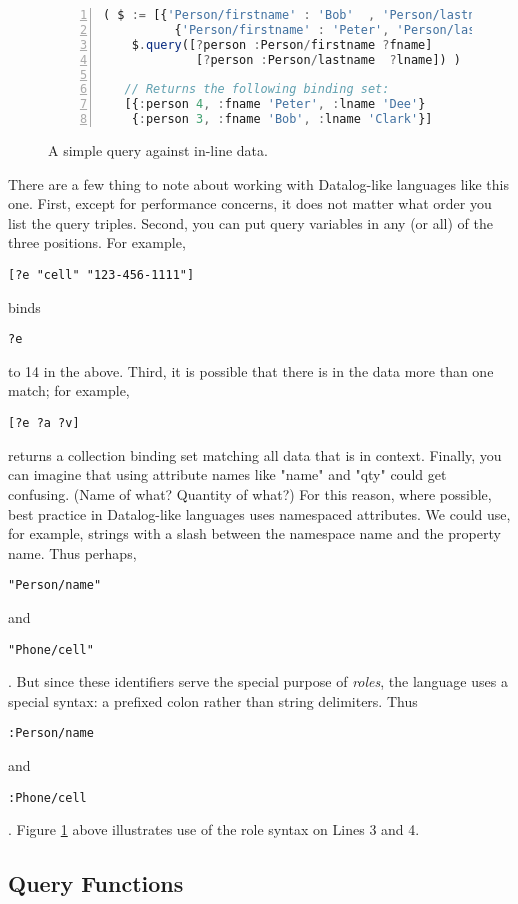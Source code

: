 \documentclass[9pt,letterpaper]{article}
\newcommand{\stt}[1]{\begin{footnotesize}\texttt{#1}\end{footnotesize}}
\begin{document}
\begin{figure}[H]
  \caption{A simple query against in-line data.}
  \label{code:simple-binding-set}
\begin{lstlisting}[language=JavaScript,numberstyle=\scriptsize,basicstyle=\ttfamily\scriptsize,numbers=left,stepnumber=1,breaklines=true]
  ( $ := [{'Person/firstname' : 'Bob'  , 'Person/lastname' : 'Clark'},
          {'Person/firstname' : 'Peter', 'Person/lastname' : 'Dee'}];
    $.query([?person :Person/firstname ?fname]
             [?person :Person/lastname  ?lname]) )

   // Returns the following binding set:
   [{:person 4, :fname 'Peter', :lname 'Dee'} 
    {:person 3, :fname 'Bob', :lname 'Clark'}]
\end{lstlisting}
\end{figure}

There are a few thing to note about working with Datalog-like languages like this one.
First, except for performance concerns, it does not matter what order you list the query triples.
Second, you can put query variables in any (or all) of the three positions.
For example, \stt{[?e "cell" "123-456-1111"]} binds \stt{?e} to 14 in the above.
Third, it is possible that there is in the data more than one match;
for example, \stt{[?e ?a ?v]} returns a collection binding set matching all data that is in context.
Finally, you can imagine that using attribute names like "name" and "qty" could get confusing. (Name of what? Quantity of what?)
For this reason, where possible, best practice in Datalog-like languages uses namespaced attributes.
We could use, for example, strings with a slash between the namespace name and the property name.
Thus perhaps, \stt{"Person/name"} and \stt{"Phone/cell"}.
But since these identifiers serve the special purpose of \textit{roles}, the language uses a special syntax: a prefixed colon rather than string delimiters.
Thus \stt{:Person/name} and \stt{:Phone/cell}.
Figure \ref{code:simple-binding-set} above illustrates use of the role syntax on Lines 3 and 4.

\subsection{Query Functions}
\end{document}
